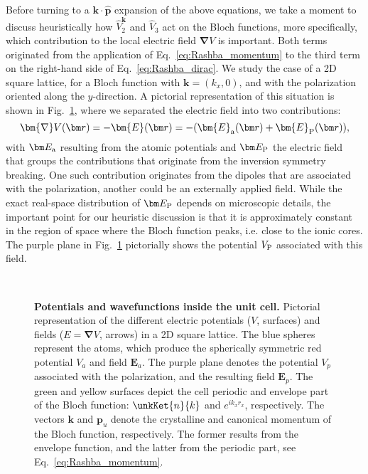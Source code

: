 Before turning to a $\bm{k} \cdot \hat{\bm{p}}$ expansion of the above equations, we take a moment to discuss heuristically how $\hat{V}^{\bm k}_2$ and $\hat{V}_3$ act on the Bloch functions, more specifically, which contribution to the local electric field $\bm{\nabla}V$ is important.
Both terms originated from the application of Eq.~\eqref{eq:Rashba_momentum} to the third term on the right-hand side of Eq.~\eqref{eq:Rashba_dirac}.
We study the case of a 2D square lattice, for a Bloch function with $\bm k = (k_x, 0)$, and with the polarization oriented along the $y$-direction.
A pictorial representation of this situation is shown in Fig.~\ref{fig:Efield_cell_drawing}, where we separated the electric field into two contributions:
\begin{equation}
	\bm{\nabla} V(\bm r) = - \bm{E}(\bm r) = - (\bm{E}_{\rm a}(\bm r) + \bm{E}_{\rm P}(\bm r)),
\end{equation}
with $\bm E_{\rm a}$ resulting from the atomic potentials and $\bm E_{\rm P}$ the electric field that groups the contributions that originate from the inversion symmetry breaking. One such contribution originates from the dipoles that are associated with the polarization, another could be an externally applied field.
While the exact real-space distribution of $\bm E_{\rm P}$ depends on microscopic details, the important point for our heuristic discussion is that it is approximately constant in the region of space where the Bloch function peaks, i.e. close to the ionic cores.
The purple plane in Fig.~\ref{fig:Efield_cell_drawing} pictorially shows the potential $V_{\rm P}$ associated with this field.   
\begin{figure}[h]
~\centering
{}\caption{\label{fig:Efield_cell_drawing}{\bf Potentials and wavefunctions inside the unit cell.} Pictorial representation of the different electric potentials ($V$, surfaces) and fields ($E=\bm \nabla V$, arrows) in a 2D square lattice. The blue spheres represent the atoms, which produce the spherically symmetric red potential $V_a$ and field $\bm E_a$. The purple plane denotes the potential $V_p$ associated with the polarization, and the resulting field $\bm E_p$. The green and yellow surfaces depict the cell periodic and envelope part of the Bloch function: $\unkKet{n}{k}$ and $e^{ik_x r_x}$, respectively. The vectors $\bm k$ and $\bm p_u$ denote the crystalline and canonical momentum of the Bloch function, respectively.
The former results from the envelope function, and the latter from the periodic part, see Eq.~\eqref{eq:Rashba_momentum}.}
\end{figure}
    
